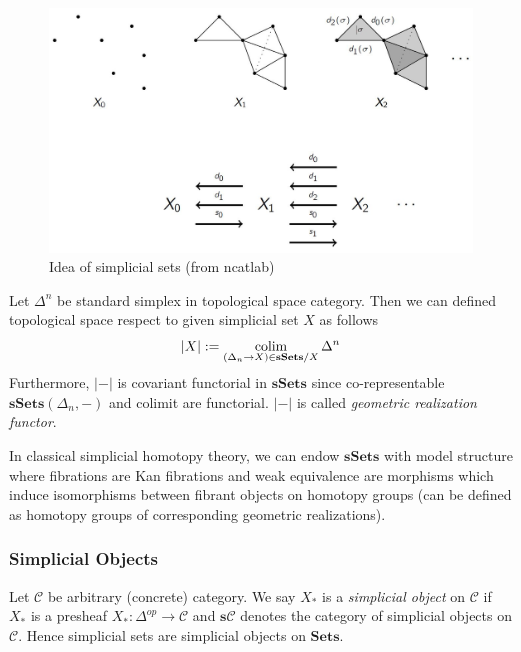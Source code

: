 \documentclass[b5paper,10pt]{article}
\begin{document}
\begin{figure}[h]
	\caption{Idea of simplicial sets (from ncatlab)}
\centering\includegraphics[scale=0.5]{PIC/SimplicialSetsIdea.jpg}
\end{figure}

Let $\Delta^n$ be standard simplex in topological space category. Then we can defined topological space respect to given simplicial set $X$ as follows
\[
|X| := \operatorname*{colim}_{(\Delta_n \to X) \in \mathbf{sSets}/X} \Delta^n
\]
Furthermore, $|-|$ is covariant functorial in $\mathbf{sSets}$ since co-representable $\mathbf{sSets}(\Delta_n,-)$ and colimit are functorial. $|-|$ is called \emph{geometric realization functor}.

In classical simplicial homotopy theory, we can endow $\mathbf{sSets}$ with model structure where fibrations are Kan fibrations and weak equivalence are morphisms which induce isomorphisms between fibrant objects on homotopy groups (can be defined as homotopy groups of corresponding geometric realizations).
\subsubsection{Simplicial Objects}
Let $\mathcal{C}$ be arbitrary (concrete) category. We say $X_*$ is a \emph{simplicial object} on $\mathcal{C}$ if $X_*$ is a presheaf $X_* \colon \Delta^{op} \to \mathcal{C}$ and $\mathbf{s}\mathcal{C}$ denotes the category of simplicial objects on $\mathcal{C}$. Hence simplicial sets are simplicial objects on $\mathbf{Sets}$. 
\end{document}
